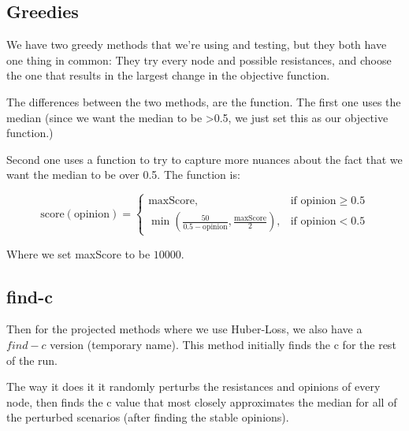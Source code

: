 \subsection{Greedies}
We have two greedy methods that we're using and testing, but they both have one thing in common: They try every node and possible resistances, and choose the one that results in the largest change in the objective function.

The differences between the two methods, are the function. The first one uses the median (since we want the median to be >0.5, we just set this as our objective function.)

Second one uses a function to try to capture more nuances about the fact that we want the median to be over 0.5. The function is:

\[
\text{score}(\text{opinion}) =
\begin{cases} 
\text{maxScore}, & \text{if } \text{opinion} \geq 0.5 \\
\min\left(\frac{50}{0.5 - \text{opinion}}, \frac{\text{maxScore}}{2}\right), & \text{if } \text{opinion} < 0.5 
\end{cases}
\] 

Where we set maxScore to be $10000$.

\subsection{find-c}
Then for the projected methods where we use Huber-Loss, we also have a $find-c$ version (temporary name). This method initially finds the c for the rest of the run. 

The way it does it it randomly perturbs the resistances and opinions of every node, then finds the c value that most closely approximates the median for all of the perturbed scenarios (after finding the stable opinions). 
